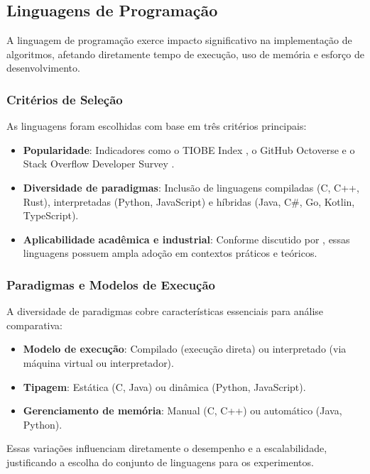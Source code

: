 \documentclass[12pt, a4paper]{article}
\begin{document}
\subsection{Linguagens de Programação}

A linguagem de programação exerce impacto significativo na implementação de algoritmos, afetando diretamente tempo de execução, uso de memória e esforço de desenvolvimento.

\subsubsection{Critérios de Seleção}

As linguagens foram escolhidas com base em três critérios principais:

\begin{itemize}
    \item \textbf{Popularidade}: Indicadores como o TIOBE Index , o GitHub Octoverse  e o Stack Overflow Developer Survey .
    \item \textbf{Diversidade de paradigmas}: Inclusão de linguagens compiladas (C, C++, Rust), interpretadas (Python, JavaScript) e híbridas (Java, C\#, Go, Kotlin, TypeScript).
    \item \textbf{Aplicabilidade acadêmica e industrial}: Conforme discutido por , essas linguagens possuem ampla adoção em contextos práticos e teóricos.
\end{itemize}

\subsubsection{Paradigmas e Modelos de Execução}

A diversidade de paradigmas cobre características essenciais para análise comparativa:

\begin{itemize}
    \item \textbf{Modelo de execução}: Compilado (execução direta) ou interpretado (via máquina virtual ou interpretador).
    \item \textbf{Tipagem}: Estática (C, Java) ou dinâmica (Python, JavaScript).
    \item \textbf{Gerenciamento de memória}: Manual (C, C++) ou automático (Java, Python).
\end{itemize}

Essas variações influenciam diretamente o desempenho e a escalabilidade, justificando a escolha do conjunto de linguagens para os experimentos.
\end{document}
